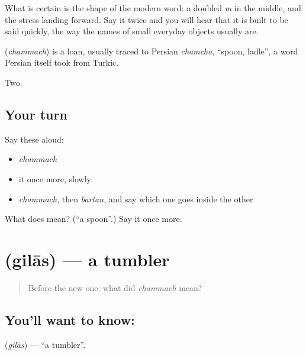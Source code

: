 What is certain is the shape of the modern word: a doubled \emph{m} in the middle, and the stress landing forward. Say it twice and you will hear that it is built to be said quickly, the way the names of small everyday objects usually are.

\begin{cousinweb}
\textbf{} (\emph{chammach}) is a loan, usually traced to Persian \emph{chamcha}, \textquotedblleft{}spoon, ladle\textquotedblright{}, a word Persian itself took from Turkic.
\end{cousinweb}

\begin{grammarlens}[title={What you've built}]
Two.
\end{grammarlens}

\subsection*{Your turn}
Say these aloud:

\begin{itemize}
\raggedright
  \item \emph{chammach}
  \item it once more, slowly
  \item \emph{chammach}, then \emph{bartan}, and say which one goes inside the other
\end{itemize}

\begin{tcolorbox}[breakable,colback=teal!4,colframe=teal!35!black,title={Before you move on}]
What does  mean? (\textquotedblleft{}a spoon\textquotedblright{}.) Say it once more.
\end{tcolorbox}
\section[\texorpdfstring{\hi{गिलास} (gilās)}{गिलास (gilās)}]{ (gilās) — a tumbler}

\label{lesson:HI-C61-tumbler}



\begin{quote}
Before the new one: what did \emph{chammach} mean?
\end{quote}

\subsection*{You'll want to know: }
\textbf{} (\emph{gilās}) — \textquotedblleft{}a tumbler\textquotedblright{}.

